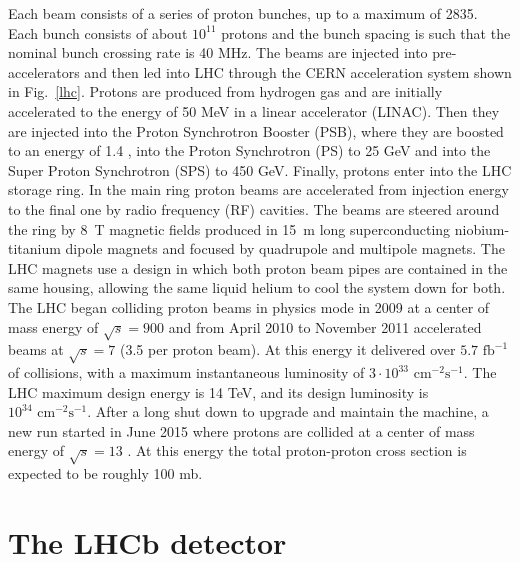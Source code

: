 Each beam consists of a series of proton bunches, up to a maximum of 2835. Each bunch consists of about $10^{11}$
protons and the bunch spacing is such that the nominal bunch crossing rate is 40 MHz. The beams are injected into
pre-accelerators and then led into LHC through the CERN acceleration system shown in Fig.~\ref{lhc}. Protons are
produced from hydrogen gas and are initially accelerated to the energy of 50 MeV in a linear accelerator (LINAC).
Then they are injected into the Proton Synchrotron Booster (PSB), where they are boosted to an energy of 1.4 \gev,
into the Proton Synchrotron (PS) to 25 GeV and into the Super Proton Synchrotron (SPS) to 450 GeV. Finally, protons
enter into the LHC storage ring. In the main ring proton beams are accelerated from injection energy to the final one
by radio frequency (RF) cavities. The beams are steered around the ring by 8~T magnetic fields produced in 15~m long
superconducting niobium-titanium dipole magnets and focused by quadrupole and multipole magnets. The LHC magnets
use a design in which both proton beam pipes are contained in the same housing, allowing the same liquid helium to cool 
the system down for both. The LHC began colliding proton beams in physics mode in 2009 at a center of mass
energy of $\sqrt{s} = 900$ \gev and from April 2010 to November 2011 accelerated beams at $\sqrt{s} = 7$ \tev (3.5 \tev per
proton beam). At this energy it delivered over $5.7 \text{ fb}^{-1}$ of collisions, with a maximum instantaneous
luminosity of $3\cdot10^{33} \text{ cm}^{-2}\text{s}^{-1}$. The LHC maximum design energy is 14 TeV, and its design
luminosity is $10^{34} \text{ cm}^{-2}\text{s}^{-1}$. After a long shut down to upgrade and maintain the machine, a
new run started in June 2015 where protons are collided at a center of mass energy of $\sqrt{s} = 13$ \tev. At this
energy the total proton-proton cross section is expected to be roughly 100 mb.

\section{The LHCb detector}

